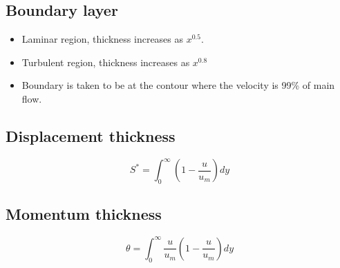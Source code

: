 \subsection{Boundary layer}
\begin{itemize}
  \item Laminar region, thickness increases as \(x^{0.5}\).
  \item Turbulent region, thickness increases as \( x^{0.8} \)
  \item Boundary is taken to be at the contour where the velocity is 99\% of main flow.
\end{itemize}
\subsection{Displacement thickness}
\[ S^* = \int_0^\infty \left( 1 - \frac{u}{u_m} \right) dy \]
\subsection{Momentum thickness}
\[ \theta = \int_0^\infty \frac{u}{u_m} \left( 1 - \frac{u}{u_m} \right) dy \]
